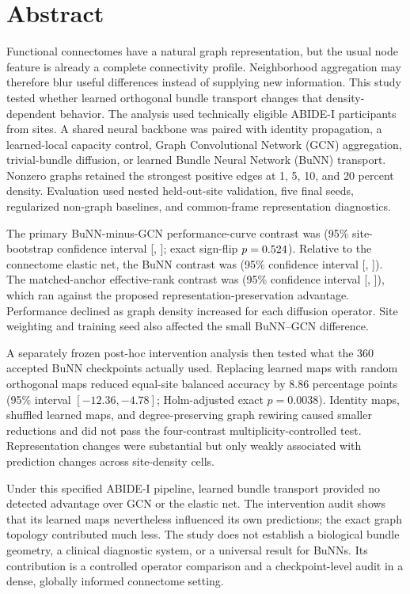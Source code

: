 \documentclass[11pt,a4paper]{article}
\begin{document}
\section*{Abstract}

Functional connectomes have a natural graph representation, but the usual
node feature is already a complete connectivity profile. Neighborhood
aggregation may therefore blur useful differences instead of supplying new
information. This study tested whether learned orthogonal bundle transport
changes that density-dependent behavior. The analysis used
\StudyParticipants{} technically eligible ABIDE-I participants from
\StudySites{} sites. A shared neural backbone was paired with identity
propagation, a learned-local capacity control, Graph Convolutional Network
(GCN) aggregation, trivial-bundle diffusion, or learned Bundle Neural Network
(BuNN) transport. Nonzero graphs retained the strongest positive edges at 1,
5, 10, and 20 percent density. Evaluation used nested held-out-site validation,
five final seeds, regularized non-graph baselines, and common-frame
representation diagnostics.

The primary BuNN-minus-GCN performance-curve contrast was
\BunnGcnEstimate{} (95\% site-bootstrap confidence interval
[\BunnGcnCILow{}, \BunnGcnCIHigh{}]; exact sign-flip
$p=0.524$). Relative to the connectome elastic net, the BuNN contrast was
\BunnElasticEstimate{} (95\% confidence interval
[\BunnElasticCILow{}, \BunnElasticCIHigh{}]). The matched-anchor
effective-rank contrast was \RankEstimate{} (95\% confidence interval
[\RankCILow{}, \RankCIHigh{}]), which ran against the proposed
representation-preservation advantage. Performance declined as graph density
increased for each diffusion operator. Site weighting and training seed also
affected the small BuNN--GCN difference.

A separately frozen post-hoc intervention analysis then tested what the 360
accepted BuNN checkpoints actually used. Replacing learned maps with random
orthogonal maps reduced equal-site balanced accuracy by 8.86 percentage
points (95\% interval $[-12.36,-4.78]$; Holm-adjusted exact
$p=0.0038$). Identity maps, shuffled learned maps, and degree-preserving graph
rewiring caused smaller reductions and did not pass the four-contrast
multiplicity-controlled test. Representation changes were substantial but
only weakly associated with prediction changes across site-density cells.

Under this specified ABIDE-I pipeline, learned bundle transport provided no
detected advantage over GCN or the elastic net. The intervention audit shows
that its learned maps nevertheless influenced its own predictions; the exact
graph topology contributed much less. The study does not establish a
biological bundle geometry, a clinical diagnostic system, or a universal
result for BuNNs. Its contribution is a controlled operator comparison and a
checkpoint-level audit in a dense, globally informed connectome setting.
\end{document}
